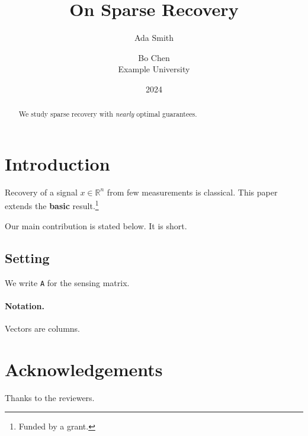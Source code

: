 \documentclass[11pt]{article}
\title{On Sparse Recovery}
\author{Ada Smith \and Bo Chen\\ Example University}
\date{2024}
\begin{document}
\maketitle
\begin{abstract}
We study sparse recovery with \emph{nearly} optimal guarantees.
\end{abstract}

\section{Introduction}
Recovery of a signal $x \in \mathbb{R}^n$ from few measurements is classical.
This paper extends the \textbf{basic} result.\footnote{Funded by a grant.}

Our main contribution is stated below. It is short.

\subsection{Setting}
We write \texttt{A} for the sensing matrix.

\paragraph{Notation.} Vectors are columns.

\section*{Acknowledgements}
Thanks to the reviewers.
\end{document}
